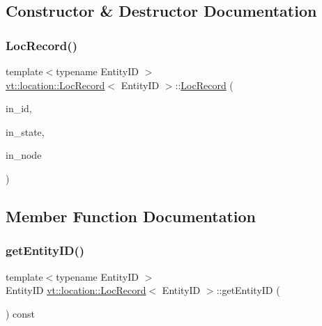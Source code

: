 \subsection{Constructor \& Destructor Documentation}
\mbox{\label{structvt_1_1location_1_1_loc_record_ade33ca9b748edfc1cacdf1738700ef5b}} 
\subsubsection{\texorpdfstring{Loc\+Record()}{LocRecord()}}
{\footnotesize\ttfamily template$<$typename Entity\+ID $>$ \\
\hyperlink{structvt_1_1location_1_1_loc_record}{vt\+::location\+::\+Loc\+Record}$<$ Entity\+ID $>$\+::\hyperlink{structvt_1_1location_1_1_loc_record}{Loc\+Record} (\begin{DoxyParamCaption}\item[{Entity\+ID const \&}]{in\+\_\+id,  }\item[{\hyperlink{namespacevt_1_1location_a7a5c74aad68cf57281515029d8521547}{Loc\+State\+Type} const \&}]{in\+\_\+state,  }\item[{\hyperlink{namespacevt_a866da9d0efc19c0a1ce79e9e492f47e2}{Node\+Type} const \&}]{in\+\_\+node }\end{DoxyParamCaption})}



\subsection{Member Function Documentation}
\mbox{\label{structvt_1_1location_1_1_loc_record_a710d9bbd99da0c19d1270a06eff6dd6a}} 
\subsubsection{\texorpdfstring{get\+Entity\+I\+D()}{getEntityID()}}
{\footnotesize\ttfamily template$<$typename Entity\+ID $>$ \\
Entity\+ID \hyperlink{structvt_1_1location_1_1_loc_record}{vt\+::location\+::\+Loc\+Record}$<$ Entity\+ID $>$\+::get\+Entity\+ID (\begin{DoxyParamCaption}{ }\end{DoxyParamCaption}) const}

